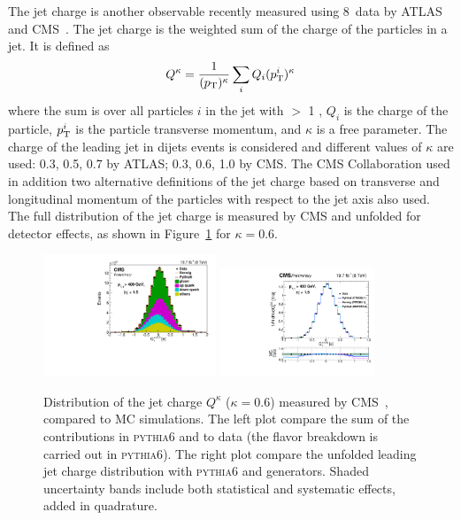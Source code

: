 \documentclass{PoS}
\providecommand{\PYTHIAS} {{\textsc{pythia6}}\xspace}
\begin{document}
The jet charge is another observable recently measured using 8~\TeV data by ATLAS~\cite{Aad:2015cua} and
CMS~\cite{CMS:2016yuu}. The jet charge is the \pt weighted sum of the charge of the particles in a
jet. It is defined as 
\begin{equation} \label{Omdef}
Q^\kappa = \frac{1}{(\pt)^\kappa} \sum_{i} Q_i (\pt^i)^\kappa
\end{equation}
where the sum is over all particles $i$ in the jet with \pt $>$ 1 \GeV, $Q_i$ is the charge of the particle, $p_{\mathrm{T}}^i$ is
the particle transverse momentum, and $\kappa$ is a free parameter. The charge of the leading jet in dijets events is
considered and different values of $\kappa$ are used: 0.3, 0.5, 0.7 by
ATLAS; 0.3, 0.6, 1.0 by CMS. 
The CMS Collaboration used in addition two alternative definitions of the jet charge based on transverse and
longitudinal momentum of the particles with respect to the jet axis also used. The full distribution of
the jet charge is measured by CMS and unfolded for detector effects, as shown in Figure~\ref{fig:cmscharge} for $\kappa=0.6$.
\begin{figure}[htb]
\begin{center}
\includegraphics[width=0.46\textwidth]{Figure10c.pdf}
\includegraphics[width=0.41\textwidth]{Figure10d.pdf}
\caption{Distribution of the jet charge $Q^\kappa$ ($\kappa=0.6$) measured by CMS~\cite{CMS:2016yuu}, compared to MC simulations.
The left plot compare the sum of the contributions in \PYTHIAS and \HERWIGpp to data (the flavor breakdown is carried
out in \PYTHIAS). The right plot compare the unfolded leading jet charge distribution with \PYTHIAS and \HERWIGpp generators. Shaded uncertainty bands include both statistical and systematic effects, added in quadrature.}
\label{fig:cmscharge}
\end{center}
\end{figure}
\end{document}
